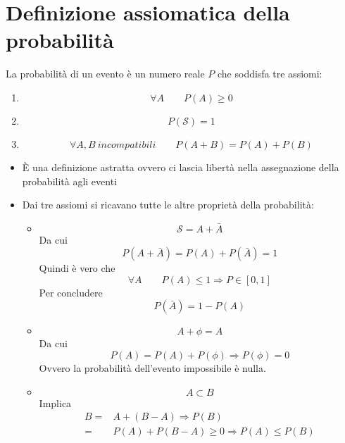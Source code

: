\documentclass[11pt,a4paper]{book}
\begin{document}
\section{Definizione assiomatica della probabilità} 
La probabilità di un evento è un numero reale $ P $ che soddisfa tre assiomi:
\begin{enumerate}
\item 
\begin{equation}
\forall A\qquad P(A) \geq 0
\end{equation}
\item 
\begin{equation}
P(\mathcal{S})=1
\end{equation}
\item 
\begin{equation}
\forall A,B \ \textit{incompatibili} \qquad P(A+B) = P(A)+P(B)
\end{equation}
\end{enumerate}
\begin{itemize}
\item \`{E} una definizione astratta ovvero ci lascia libertà nella assegnazione della probabilità agli eventi
\item Dai tre assiomi si ricavano tutte le altre proprietà della probabilità:
\begin{itemize}
\item \begin{equation}
\mathcal{S} = A + \bar{A}
\end{equation}
Da cui
\begin{equation}
P(A+\bar{A}) = P(A) + P(\bar{A}) = 1
\end{equation}
Quindi è vero che
\begin{equation}
\forall A \qquad P(A) \leq 1 \Rightarrow P \in[0,1]
\end{equation}
Per concludere
\begin{equation}
P(\bar{A}) = 1 - P(A)
\end{equation}
\item \begin{equation}
A + \phi = A
\end{equation}
Da cui
\begin{equation}
P(A) = P(A)+ P (\phi) \Rightarrow P(\phi) = 0
\end{equation}
Ovvero la probabilità dell'evento impossibile è nulla.
\item 
\begin{equation}
A \subset B
\end{equation}
Implica
\begin{align}
B =& A+ (B-A) \Rightarrow P(B)\\=&P(A)+P(B-A) \geq 0 \Rightarrow P(A) \leq P(B)
\end{align}
\end{itemize}
\end{itemize}
\end{document}
